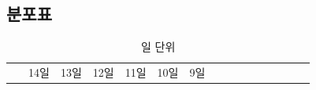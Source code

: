 \documentclass[
]{book}
\begin{document}
\subsection{분포표}\label{uxbd84uxd3ecuxd45c}

\begin{longtable}[]{@{}
  >{\raggedright\arraybackslash}p{}
  >{\centering\arraybackslash}p{}
  >{\centering\arraybackslash}p{}
  >{\centering\arraybackslash}p{}
  >{\centering\arraybackslash}p{}
  >{\centering\arraybackslash}p{}
  >{\centering\arraybackslash}p{}
  >{\centering\arraybackslash}p{}
  >{\centering\arraybackslash}p{}
  >{\centering\arraybackslash}p{}
  >{\centering\arraybackslash}p{}
  >{\centering\arraybackslash}p{}
  >{\centering\arraybackslash}p{}
  >{\centering\arraybackslash}p{}
  >{\centering\arraybackslash}p{}
  >{\centering\arraybackslash}p{}@{}}
\caption{일 단위}\tabularnewline
\toprule\noalign{}
\begin{minipage}[b]{\linewidth}\raggedright
~
\end{minipage} & \begin{minipage}[b]{\linewidth}\centering
14일
\end{minipage} & \begin{minipage}[b]{\linewidth}\centering
13일
\end{minipage} & \begin{minipage}[b]{\linewidth}\centering
12일
\end{minipage} & \begin{minipage}[b]{\linewidth}\centering
11일
\end{minipage} & \begin{minipage}[b]{\linewidth}\centering
10일
\end{minipage} & \begin{minipage}[b]{\linewidth}\centering
9일
\end{minipage} & \begin{minipage}[b]{\linewidth}\centering

\end{minipage}
\end{longtable}
\end{document}
